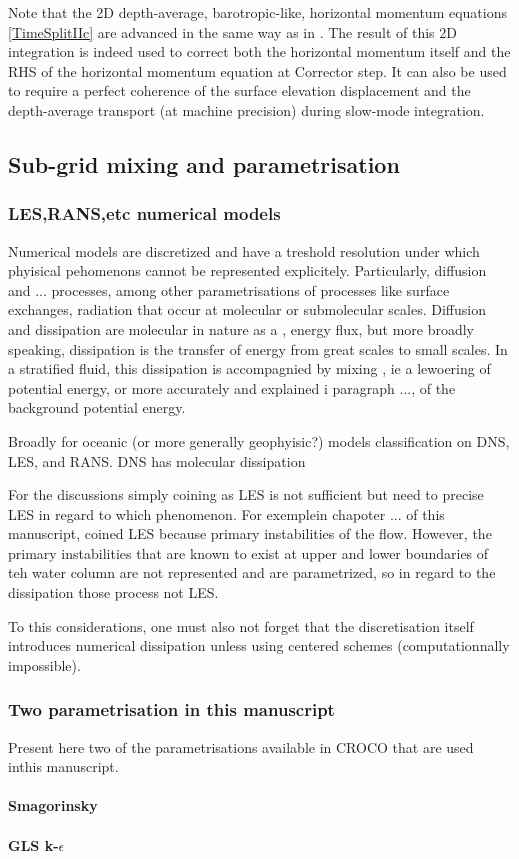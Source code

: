 Note that the 2D depth-average, barotropic-like, horizontal momentum equations \ref{TimeSplitIIc} are advanced in the same way as in \cite{shchepetkin_regional_2005}. The result of this 2D integration is indeed used to correct both the horizontal momentum itself and the RHS of the horizontal momentum equation at Corrector step. It can also be used to require a perfect coherence of the surface elevation displacement and the depth-average transport (at machine precision) during slow-mode integration. 

\subsection{Sub-grid mixing and parametrisation}

\subsubsection{LES,RANS,etc numerical models}
Numerical models are discretized and have a treshold resolution under which phyisical pehomenons cannot be represented explicitely. Particularly, diffusion and ... processes,  among other parametrisations of processes like surface exchanges, radiation that occur at molecular or submolecular scales. Diffusion and dissipation are molecular in nature as a , energy flux, but more broadly speaking, dissipation is the transfer of energy from great scales to small scales. In a stratified fluid, this dissipation is accompagnied by mixing , ie a lewoering of potential energy, or more accurately and explained i paragraph ..., of the background potential energy.

Broadly for oceanic (or more generally geophyisic?) models classification on DNS, LES, and RANS. DNS has molecular dissipation


For the discussions simply coining as LES is not sufficient but need to precise LES in regard to which phenomenon. For exemplein chapoter ... of this manuscript, coined LES because primary instabilities of the flow. However, the primary instabilities that are known to exist at upper and lower boundaries of teh water column are not represented and are parametrized, so in regard to the dissipation those process not LES. 



To this considerations, one must also not forget that the discretisation itself introduces numerical dissipation unless using centered schemes (computationnally impossible).

\subsubsection{Two parametrisation in this manuscript}
Present here two of the parametrisations available in CROCO that are used inthis manuscript.

\paragraph{Smagorinsky}


\paragraph{GLS k-$\epsilon$}






